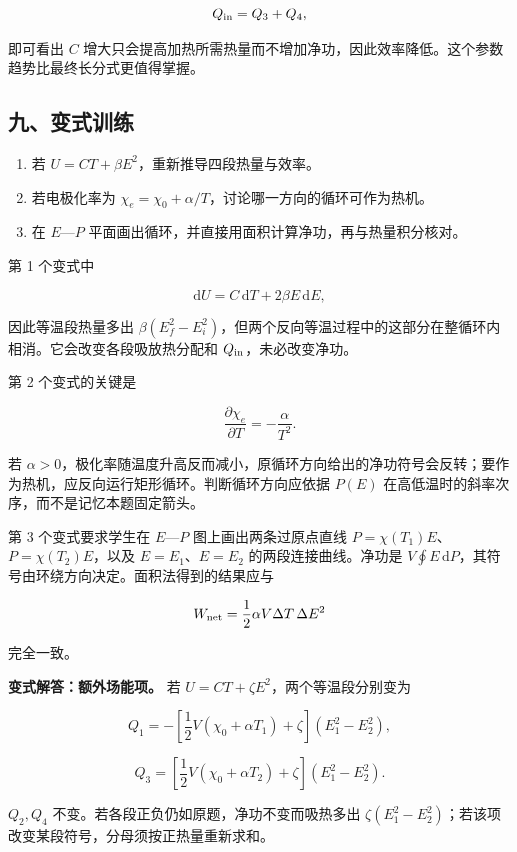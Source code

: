 \documentclass[12pt,a4paper,UTF8]{ctexart}
\newcommand{\tightlist}{\setlength{\itemsep}{0pt}\setlength{\parskip}{0pt}}
\begin{document}
\[Q_{\rm in}=Q_3+Q_4,\]

即可看出 \(C\)
增大只会提高加热所需热量而不增加净功，因此效率降低。这个参数趋势比最终长分式更值得掌握。

\subsection{九、变式训练}\label{ux4e5dux53d8ux5f0fux8badux7ec3-5}

\begin{enumerate}
\def\labelenumi{\arabic{enumi}.}
\tightlist
\item
  若 \(U=CT+\beta E^2\)，重新推导四段热量与效率。
\item
  若电极化率为
  \(\chi_e=\chi_0+\alpha/T\)，讨论哪一方向的循环可作为热机。
\item
  在 \(E\)---\(P\)
  平面画出循环，并直接用面积计算净功，再与热量积分核对。
\end{enumerate}

第 1 个变式中

\[\mathrm dU=C\,\mathrm dT+2\beta E\,\mathrm dE,\]

因此等温段热量多出
\(\beta(E_f^2-E_i^2)\)，但两个反向等温过程中的这部分在整循环内相消。它会改变各段吸放热分配和
\(Q_{\rm in}\)，未必改变净功。

第 2 个变式的关键是

\[\frac{\partial\chi_e}{\partial T}=-\frac{\alpha}{T^2}.\]

若
\(\alpha>0\)，极化率随温度升高反而减小，原循环方向给出的净功符号会反转；要作为热机，应反向运行矩形循环。判断循环方向应依据
\(P(E)\) 在高低温时的斜率次序，而不是记忆本题固定箭头。

第 3 个变式要求学生在 \(E\)---\(P\) 图上画出两条过原点直线
\(P=\chi(T_1)E\)、\(P=\chi(T_2)E\)，以及 \(E=E_1\)、\(E=E_2\)
的两段连接曲线。净功是
\(V\oint E\,\mathrm dP\)，其符号由环绕方向决定。面积法得到的结果应与

\[W_{\rm net}=\frac12\alpha V\Delta T\,\Delta E^2\]

完全一致。

\textbf{变式解答：额外场能项。} 若
\(U=CT+\zeta E^2\)，两个等温段分别变为

\[Q_1=-\left[\frac12V(\chi_0+\alpha T_1)+\zeta\right](E_1^2-E_2^2),\]

\[Q_3=\left[\frac12V(\chi_0+\alpha T_2)+\zeta\right](E_1^2-E_2^2).\]

\(Q_2,Q_4\) 不变。若各段正负仍如原题，净功不变而吸热多出
\(\zeta(E_1^2-E_2^2)\)；若该项改变某段符号，分母须按正热量重新求和。
\end{document}
